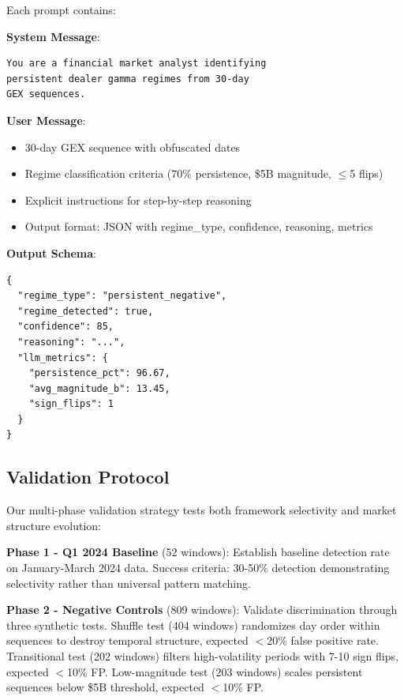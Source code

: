 Each prompt contains:

\vspace{0.2cm}

\noindent\textbf{System Message}:
\begin{verbatim}
You are a financial market analyst identifying
persistent dealer gamma regimes from 30-day
GEX sequences.
\end{verbatim}

\vspace{0.2cm}

\noindent\textbf{User Message}:
\begin{itemize}
\item 30-day GEX sequence with obfuscated dates
\item Regime classification criteria (70\% persistence, \$5B magnitude, $\leq$5 flips)
\item Explicit instructions for step-by-step reasoning
\item Output format: JSON with regime\_type, confidence, reasoning, metrics
\end{itemize}

\vspace{0.2cm}

\noindent\textbf{Output Schema}:
\begin{verbatim}
{
  "regime_type": "persistent_negative",
  "regime_detected": true,
  "confidence": 85,
  "reasoning": "...",
  "llm_metrics": {
    "persistence_pct": 96.67,
    "avg_magnitude_b": 13.45,
    "sign_flips": 1
  }
}
\end{verbatim}

\subsection{Validation Protocol}

Our multi-phase validation strategy tests both framework selectivity and market structure evolution:

\vspace{0.2cm}

\noindent\textbf{Phase 1 - Q1 2024 Baseline} (52 windows): Establish baseline detection rate on January-March 2024 data. Success criteria: 30-50\% detection demonstrating selectivity rather than universal pattern matching.

\vspace{0.2cm}

\noindent\textbf{Phase 2 - Negative Controls} (809 windows): Validate discrimination through three synthetic tests. Shuffle test (404 windows) randomizes day order within sequences to destroy temporal structure, expected $<$20\% false positive rate. Transitional test (202 windows) filters high-volatility periods with 7-10 sign flips, expected $<$10\% FP. Low-magnitude test (203 windows) scales persistent sequences below \$5B threshold, expected $<$10\% FP.

